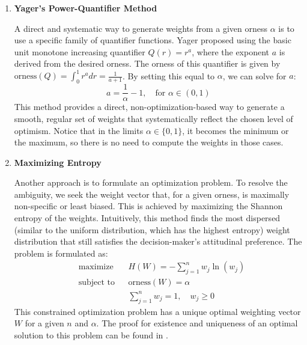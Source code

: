 \begin{enumerate}[label=(\roman*)]
    \item \textbf{Yager's Power-Quantifier Method}
    
    A direct and systematic way to generate weights from a given orness $\alpha$ is to use a specific family of quantifier functions. Yager proposed using the basic unit monotone increasing quantifier $Q(r) = r^a$, where the exponent $a$ is derived from the desired orness. The orness of this quantifier is given by $\text{orness}(Q) = \int_0^1 r^a dr = \frac{1}{a+1}$. By setting this equal to $\alpha$, we can solve for $a$:
    \begin{equation}
        a = \frac{1}{\alpha} - 1, \quad \text{for } \alpha \in (0, 1)
    \end{equation}
    This method provides a direct, non-optimization-based way to generate a smooth, regular set of weights that systematically reflect the chosen level of optimism. Notice that in the limits $\alpha \in \{0,1\}$, it becomes the minimum or the maximum, so there is no need to compute the weights in those cases.

    \item \textbf{Maximizing Entropy}
    
    Another approach is to formulate an optimization problem. To resolve the ambiguity, we seek the weight vector that, for a given orness, is maximally non-specific or least biased. This is achieved by maximizing the Shannon entropy of the weights. Intuitively, this method finds the most dispersed (similar to the uniform distribution, which has the highest entropy) weight distribution that still satisfies the decision-maker's attitudinal preference. The problem is formulated as:
    \begin{equation}
    \begin{aligned}
        & \text{maximize}   & & H(W) = -\sum_{j=1}^{n} w_j \ln(w_j) \\
        & \text{subject to} & & \text{orness}(W) = \alpha \\
        &                   & & \sum_{j=1}^{n} w_j = 1, \quad w_j \ge 0
    \end{aligned}
    \end{equation}
    This constrained optimization problem has a unique optimal weighting vector $W$ for a given $n$ and $\alpha$. The proof for existence and uniqueness of an optimal solution to this problem can be found in \cite[Sec.~2.3]{FULLER2}.
\end{enumerate}

